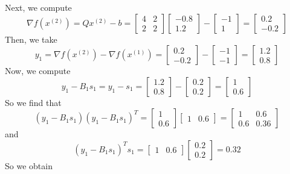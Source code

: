 \documentclass[12pt]{article}
\begin{document}
Next, we compute
\[
\nabla f(x^{(2)}) = Qx^{(2)} - b = \begin{bmatrix}
4 & 2\\
2 & 2
\end{bmatrix} \begin{bmatrix}
-0.8\\
1.2
\end{bmatrix} - \begin{bmatrix}
-1\\
1
\end{bmatrix} =
\begin{bmatrix}
0.2\\
-0.2
\end{bmatrix}
\] Then, we take
\[
y_1 = \nabla f(x^{(2)}) - \nabla f(x^{(1)}) = \begin{bmatrix}
0.2\\
-0.2
\end{bmatrix} -  \begin{bmatrix}
-1 \\ -1
\end{bmatrix} = 
 \begin{bmatrix}
1.2 \\ 0.8
\end{bmatrix} 
\] Now, we compute
\[
y_1 - B_1 s_1 = y_1 - s_1 =  \begin{bmatrix}
1.2 \\ 0.8
\end{bmatrix} - \begin{bmatrix}
0.2\\
0.2
\end{bmatrix} =
\begin{bmatrix}
1\\
0.6
\end{bmatrix}
\] So we find that
\[
(y_1 - B_1 s_1)(y_1 - B_1 s_1)^T = \begin{bmatrix}
1\\
0.6
\end{bmatrix} \begin{bmatrix}
1 & 0.6
\end{bmatrix} =
\begin{bmatrix}
1 & 0.6\\
0.6 & 0.36
\end{bmatrix}
\] and
\[
(y_1 - B_1 s_1)^T s_1 = \begin{bmatrix}
1 & 0.6
\end{bmatrix}  \begin{bmatrix}
0.2\\
0.2
\end{bmatrix} = 0.32
\] So we obtain
\end{document}
